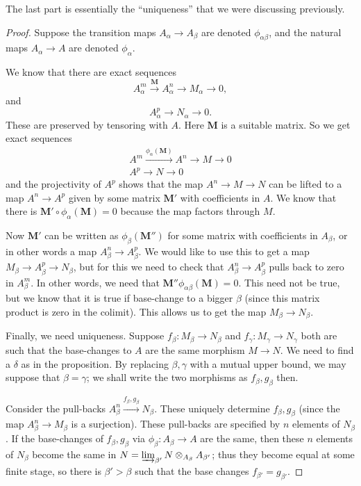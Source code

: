 The last part is essentially the ``uniqueness'' that we were discussing previously.
\begin{proof} Suppose the transition maps $A_\alpha \to A_\beta$ are denoted
$\phi_{\alpha \beta}$, and the natural maps $A_\alpha \to A$ are denoted
$\phi_\alpha$.

We know that there are exact sequences
\[ A_\alpha^m \stackrel{\textbf{M}}{\to} A_\alpha^n \to M_\alpha \to 0,  \]
and
\[ A_\alpha^p \to N_\alpha \to 0.  \]
These are preserved by tensoring with $A$. Here $\textbf{M}$ is a suitable matrix.
So we get exact sequences
\begin{gather*} 
A^m \stackrel{\phi_\alpha(\textbf{M})}{\to} A^n \to M \to 0 \\
A^p \to N \to 0
\end{gather*} 
and the projectivity of $A^p$ shows that the map $A^n \to M \to N$ can be
lifted to  a map $A^n \to A^p$ given by some matrix $\textbf{M}'$ with coefficients
in $A$. We know that there is $\textbf{M}'  \circ \phi_\alpha(\textbf{M}) = 0$
because the map factors through $M$. 

Now $\textbf{M}'$ can be written as $\phi_\beta(\textbf{M}'')$ for some matrix
with coefficients in $A_\beta$, or in other words a map $A_\beta^n \to
A_\beta^p$. We would like to use this to get a map $M_\beta \to A_\beta^p \to
N_\beta$, but for this we need to check that $A_\beta^n \to A_\beta^p$ pulls
back to zero in $A_\beta^m$. In other words, we need that
$\textbf{M}'' \phi_{\alpha \beta}( \textbf{M}) = 0$. This need not be true, but we know
that it is true if base-change to a bigger $\beta$ (since this matrix product
is zero in the colimit). This allows us to get the map $M_\beta \to N_\beta$.

Finally, we need uniqueness. Suppose $f_\beta: M_\beta \to N_\beta$ and
$f_\gamma: M_\gamma \to N_\gamma$ both are such that the base-changes to $A$
are the same morphism $M \to N$. We need to find a $\delta$ as in the
proposition. By replacing $\beta, \gamma$ with a mutual upper bound, we may
suppose that $\beta = \gamma$; we shall write the two morphisms as $f_\beta,
g_\beta$ then.

Consider the pull-backs $A_\beta^n \stackrel{f_\beta, g_\beta}{\to } N_\beta$.
These uniquely determine $f_\beta, g_\beta$ (since the map $A_\beta^n \to
M_\beta$ is a surjection). These pull-backs are specified by $n$ elements of
$N_\beta$. If the base-changes of $f_\beta, g_\beta$ via $\phi_{\beta}:
A_\beta \to A$ are the same, then these $n$ elements of $N_\beta$ become the
same in $N = \varinjlim_{\beta'} N \otimes_{A_\beta} A_{\beta'}$; thus they
become equal at some finite stage, so there is $\beta' > \beta$ such that the
base changes $f_{\beta'} = g_{\beta'}$.

\end{proof} 

